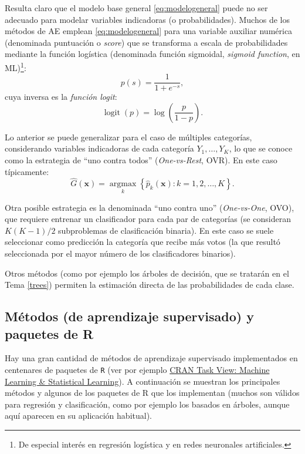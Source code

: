 \documentclass[
]{book}
\theoremstyle{break}
\theoremstyle{definition}
\theoremstyle{definition}
\theoremstyle{definition}
\theoremstyle{definition}
\theoremstyle{remark}
\begin{document}
Resulta claro que el modelo base general \eqref{eq:modelogeneral} puede no ser adecuado para modelar variables indicadoras (o probabilidades).
Muchos de los métodos de AE emplean \eqref{eq:modelogeneral} para una variable auxiliar numérica (denominada puntuación o \emph{score}) que se transforma a escala de probabilidades mediante la función logística (denominada función sigmoidal, \emph{sigmoid function}, en ML)\footnote{De especial interés en regresión logística y en redes neuronales artificiales.}:
\[p(s) = \frac{1}{1 + e^{-s}},\]
cuya inversa es la \emph{función logit}:
\[\operatorname{logit}(p)=\log\left( \frac{p}{1-p} \right).\]

Lo anterior se puede generalizar para el caso de múltiples categorías, considerando variables indicadoras de cada categoría \(Y_1, \ldots, Y_K\), lo que se conoce como la estrategia de ``uno contra todos'' (\emph{One-vs-Rest}, OVR). En este caso típicamente:
\[\hat G \left(\mathbf{x} \right) = \underset{k}{\operatorname{argmax}} \left\{ \hat p_k(\mathbf{x}) : k = 1, 2, \ldots, K \right\}.\]

Otra posible estrategia es la denominada ``uno contra uno'' (\emph{One-vs-One}, OVO), que requiere entrenar un clasificador para cada par de categorías (se consideran \(K(K-1)/2\) subproblemas de clasificación binaria).
En este caso se suele seleccionar como predicción la categoría que recibe más votos (la que resultó seleccionada por el mayor número de los clasificadores binarios).

Otros métodos (como por ejemplo los árboles de decisión, que se tratarán en el Tema \ref{trees}) permiten la estimación directa de las probabilidades de cada clase.

\hypertarget{metodos-pkgs}{%
\subsection{Métodos (de aprendizaje supervisado) y paquetes de R}\label{metodos-pkgs}}

Hay una gran cantidad de métodos de aprendizaje supervisado implementados en centenares de paquetes de \texttt{R} (ver por ejemplo \href{https://cran.r-project.org/web/views/MachineLearning.html}{CRAN Task View: Machine Learning \& Statistical Learning}).
A continuación se muestran los principales métodos y algunos de los paquetes de R que los implementan (muchos son válidos para regresión y clasificación, como por ejemplo los basados en árboles, aunque aquí aparecen en su aplicación habitual).
\end{document}
